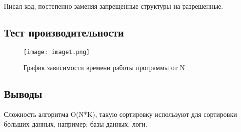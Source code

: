 \documentclass[12pt]{article}
\begin{document}
Писал код, постепенно заменяя запрещенные структуры на разрешенные. 

\subsection*{Тест производительности}

\begin{figure}[H]
    \centering
    \texttt{[image: image1.png]}
    \caption{График зависимости времени работы программы от N}
    \label{fig:graph}
\end{figure}

\subsection*{Выводы}

Сложность алгоритма O(N*K), такую сортировку используют для сортировки больших данных, например: базы данных, логи.
\end{document}
